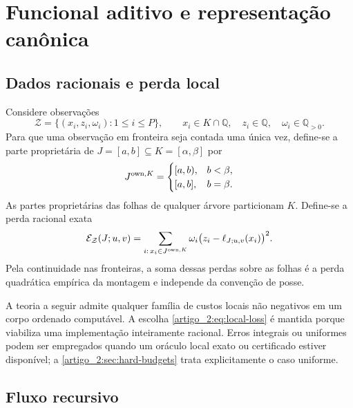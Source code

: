 \section{Funcional aditivo e representação canônica}
\label{artigo_2:sec:functional}

\subsection{Dados racionais e perda local}

Considere observações
\begin{equation}
 \mathcal Z=\{(x_i,z_i,\omega_i):1\le i\le P\},
 \qquad
 x_i\in K\cap\mathbb Q,\quad z_i\in\mathbb Q,\quad
 \omega_i\in\mathbb Q_{>0}.
 \label{artigo_2:eq:rational-data}
\end{equation}
Para que uma observação em fronteira seja contada uma única vez, define-se a
parte proprietária de $J=[a,b]\subseteq K=[\alpha,\beta]$ por
\begin{equation}
 J^{\mathrm{own},K}=
 \begin{cases}
 [a,b),&b<\beta,\\
 [a,b],&b=\beta.
 \end{cases}
 \label{artigo_2:eq:relative-ownership}
\end{equation}
As partes proprietárias das folhas de qualquer árvore particionam $K$.
Define-se a perda racional exata
\begin{equation}
 \mathcal{E}_{\mathcal Z}(J;u,v)
 =\sum_{i:\,x_i\in J^{\mathrm{own},K}}
 \omega_i\bigl(z_i-\ell_{J;u,v}(x_i)\bigr)^2.
 \label{artigo_2:eq:local-loss}
\end{equation}
Pela continuidade nas fronteiras, a soma dessas perdas sobre as folhas é a
perda quadrática empírica da montagem e independe da convenção de posse.

A teoria a seguir admite qualquer família de custos locais não negativos em um
corpo ordenado computável. A escolha \eqref{artigo_2:eq:local-loss} é mantida porque
viabiliza uma implementação inteiramente racional. Erros integrais ou uniformes
podem ser empregados quando um oráculo local exato ou certificado estiver
disponível; a \cref{artigo_2:sec:hard-budgets} trata explicitamente o caso uniforme.

\subsection{Fluxo recursivo}

